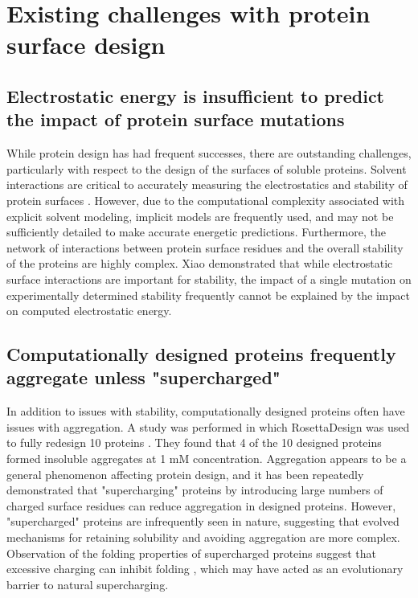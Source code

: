 \section{Existing challenges with protein surface design}

\subsection{Electrostatic energy is insufficient to predict the impact of protein surface mutations}
While protein design has had frequent successes, there are outstanding challenges, particularly with respect to the design of the surfaces of soluble proteins.
Solvent interactions are critical to accurately measuring the electrostatics and stability of protein surfaces  \citep{Park:2004kn}.
However, due to the computational complexity associated with explicit solvent modeling, implicit models are frequently used, and may not be sufficiently detailed to make accurate energetic predictions.
Furthermore, the network of interactions between protein surface residues and the overall stability of the proteins are highly complex. 
Xiao  \citep{Xiao:2013dq} demonstrated that while electrostatic surface interactions are important for stability, the impact of a single mutation on experimentally determined stability frequently cannot be explained by the impact on computed electrostatic energy.

\subsection{Computationally designed proteins frequently aggregate unless "supercharged"}
In addition to issues with stability, computationally designed proteins often have issues with aggregation.
A study was performed in which RosettaDesign was used to fully redesign 10 proteins \citep{Dantas:2003vt}.
They found that 4 of the 10 designed proteins formed insoluble aggregates at 1 mM concentration.
Aggregation appears to be a general phenomenon affecting protein design, and it has been repeatedly demonstrated that "supercharging" proteins by introducing large numbers of charged surface residues \citep{Simeonov:2011jf,Kurnik:2012dz,MichaelSLawrence:2007cv} can reduce aggregation in designed proteins.
However, "supercharged" proteins are infrequently seen in nature, suggesting that evolved mechanisms for retaining solubility and avoiding aggregation are more complex.
Observation of the folding properties of supercharged proteins suggest that excessive charging can inhibit folding \citep{MichaelSLawrence:2007cv}, which may have acted as an evolutionary  barrier to natural supercharging.

